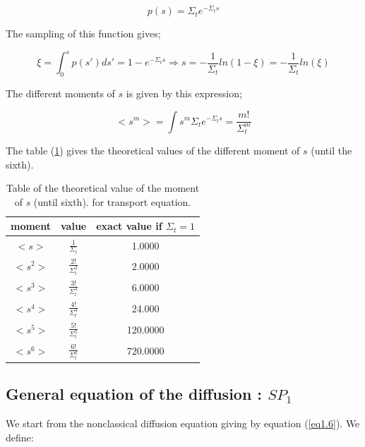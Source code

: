 \documentclass[a4paper, 12pt]{report}
\newcommand{\bl}{\big<}
\newcommand{\bg}{\big>}
\begin{document}
\begin{equation}
p(s) = \Sigma_t e ^{-\Sigma_t s}
\end{equation}

The sampling of this function gives;

\begin{equation}
\xi = \int_0^s p(s') ds' = 1 - e^{-\Sigma_t s} \Longrightarrow s = -\frac{1}{\Sigma_t}ln(1-\xi) = -\frac{1}{\Sigma_t}ln(\xi)
\end{equation}

The different moments of $s$ is given by this expression;

\begin{equation}
\bl s^m \bg = \int s^m \Sigma_t e ^{-\Sigma_t s} = \frac{m!}{\Sigma_t^m}
\end{equation}

The table (\ref{momenttransport}) gives the theoretical values of the different moment of $s$ (until the sixth).
\begin{center}
\begin{table}
\begin{center}
\begin{tabular}{|c|c|c|}
\hline
moment & value & exact value if $\Sigma_t = 1$ \\ \hline
$\bl s \bg$ &$ \frac{1}{\Sigma_t}$ & 1.0000  \\ \hline
$\bl s^2 \bg$ & $\frac{2!}{\Sigma_t^2}$ & 2.0000 \\ \hline
$\bl s^3 \bg$ &$ \frac{3!}{\Sigma_t^3}$ & 6.0000\\ \hline
$\bl s^4 \bg$ &$ \frac{4!}{\Sigma_t^4}$ & 24.000\\ \hline
$\bl s^5 \bg$ &$ \frac{5!}{\Sigma_t^5}$ & 120.0000 \\ \hline
$\bl s^6 \bg$ &$ \frac{6!}{\Sigma_t^6}$ & 720.0000 \\ \hline
\end{tabular}
\caption{\label{momenttransport} Table of the theoretical value of the moment of $s$ (until sixth). for transport equation.}
\end{center}
\end{table}
\end{center}
\subsection{General equation of the diffusion : $SP_1$}
We start from the nonclassical diffusion equation giving by equation (\ref{eq1.6}). We define:
\end{document}

